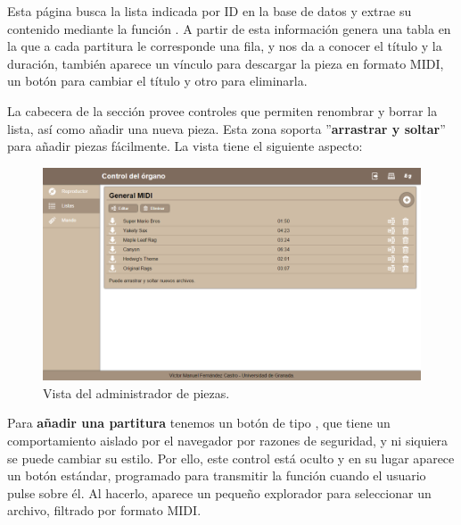 \begin{center}
\end{center}

Esta página busca la lista indicada por ID en la base de datos y extrae su contenido mediante la función . A partir de esta información genera una tabla en la que a cada partitura le corresponde una fila, y nos da a conocer el título y la duración, también aparece un vínculo para descargar la pieza en formato \acrshort{MIDI}, un botón para cambiar el título y otro para eliminarla. 

La cabecera de la sección provee controles que permiten renombrar y borrar la lista, así como añadir una nueva pieza. Esta zona soporta ''\textbf{arrastrar y soltar}'' para añadir piezas fácilmente. La vista tiene el siguiente aspecto:

\smallskip

\begin{figure}[H]
	\noindent \begin{centering}
		\includegraphics[width=\linewidth*3/4]{capitulo5/cap_piezas}
		\par\end{centering}
	\smallskip
	\caption{\label{fig:cap_piezas} Vista del administrador de piezas.}
\end{figure} 

\smallskip

Para \textbf{añadir una partitura} tenemos un botón de tipo , que tiene un comportamiento aislado por el navegador por razones de seguridad, y ni siquiera se puede cambiar su estilo. Por ello, este control está oculto y en su lugar aparece un botón  estándar, programado para transmitir la función  cuando el usuario pulse sobre él. Al hacerlo, aparece un pequeño explorador para seleccionar un archivo, filtrado por formato \acrshort{MIDI}.

